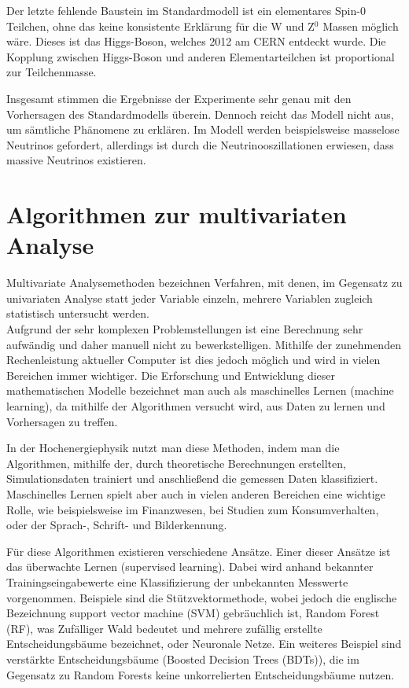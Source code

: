 Der letzte fehlende Baustein im Standardmodell ist ein elementares Spin-0 Teilchen, ohne das keine konsistente Erkl\"arung f\"ur die W und Z$^0$ Massen m\"oglich w\"are. Dieses ist das Higgs-Boson, welches 2012 am CERN entdeckt wurde. Die Kopplung zwischen Higgs-Boson und anderen Elementarteilchen ist proportional zur Teilchenmasse.

Insgesamt stimmen die Ergebnisse der Experimente sehr genau mit den Vorhersagen des Standardmodells \"uberein. Dennoch reicht das Modell nicht aus, um s\"amtliche Ph\"anomene zu erkl\"aren. Im Modell werden beispielsweise masselose Neutrinos gefordert, allerdings ist durch die Neutrinooszillationen erwiesen, dass massive Neutrinos existieren.


\section{Algorithmen zur multivariaten Analyse}
\label{ch:Theorie:sec:Algorithmen}

Multivariate Analysemethoden bezeichnen Verfahren, mit denen, im Gegensatz zu univariaten Analyse statt jeder Variable einzeln, mehrere Variablen zugleich statistisch untersucht werden.\\
Aufgrund der sehr komplexen Problemstellungen ist eine Berechnung sehr aufw\"andig und daher manuell nicht zu bewerkstelligen. Mithilfe der zunehmenden Rechenleistung aktueller Computer ist dies jedoch m\"oglich und wird in vielen Bereichen immer wichtiger. Die Erforschung und Entwicklung dieser mathematischen Modelle bezeichnet man auch als maschinelles Lernen (machine learning), da mithilfe der Algorithmen versucht wird, aus Daten zu lernen und Vorhersagen zu treffen. \cite{SWB-455193959}

In der Hochenergiephysik nutzt man diese Methoden, indem man die Algorithmen, mithilfe der, durch theoretische Berechnungen erstellten, Simulationsdaten trainiert und anschlie\ss end die gemessen Daten klassifiziert.\\ 
Maschinelles Lernen spielt aber auch in vielen anderen Bereichen eine wichtige Rolle, wie beispielsweise im Finanzwesen, bei Studien zum Konsumverhalten, oder der Sprach-, Schrift- und Bilderkennung.

F\"ur diese Algorithmen existieren verschiedene Ans\"atze. Einer dieser Ans\"atze ist das \"uberwachte Lernen (supervised learning). Dabei wird anhand bekannter Trainingseingabewerte eine Klassifizierung der unbekannten Messwerte vorgenommen. Beispiele sind die St\"utzvektormethode, wobei jedoch die englische Bezeichnung support vector machine (SVM) gebr\"auchlich ist, Random Forest (RF), was Zuf\"alliger Wald bedeutet und mehrere zuf\"allig erstellte Entscheidungsb\"aume bezeichnet, oder Neuronale Netze. Ein weiteres Beispiel sind verst\"arkte Entscheidungsb\"aume (Boosted Decision Trees (BDTs)), die im Gegensatz zu Random Forests keine unkorrelierten Entscheidungsb\"aume nutzen.



